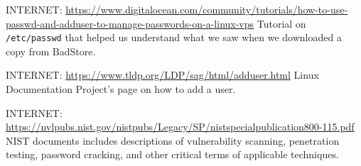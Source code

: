 \endnote{[34]}  INTERNET: \url{https://www.digitalocean.com/community/tutorials/how-to-use-passwd-and-adduser-to-manage-passwords-on-a-linux-vps}
Tutorial on \texttt{/etc/passwd} that helped us understand what we saw when we downloaded a copy from BadStore.

\endnote{[35]}  INTERNET: \url{https://www.tldp.org/LDP/sag/html/adduser.html}
Linux Documentation Project's page on how to add a user.

\endnote{[36]}  INTERNET: \url{https://nvlpubs.nist.gov/nistpubs/Legacy/SP/nistspecialpublication800-115.pdf}
NIST documents includes descriptions of vulnerability scanning, penetration testing, password cracking, and other critical terms of applicable techniques.

